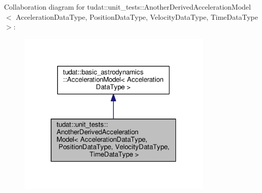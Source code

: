 Collaboration diagram for tudat\+:\+:unit\+\_\+tests\+:\+:Another\+Derived\+Acceleration\+Model$<$ Acceleration\+Data\+Type, Position\+Data\+Type, Velocity\+Data\+Type, Time\+Data\+Type $>$\+:
\nopagebreak
\begin{figure}[H]
\begin{center}
\leavevmode
\includegraphics[width=265pt]{classtudat_1_1unit__tests_1_1AnotherDerivedAccelerationModel__coll__graph}
\end{center}
\end{figure}
